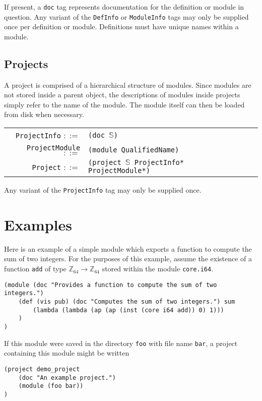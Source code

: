 \documentclass[11pt]{book}
\begin{document}
If present, a \lstinline{doc} tag represents documentation for the definition or module in question.
Any variant of the \lstinline{DefInfo} or \lstinline{ModuleInfo} tags may only be supplied once per definition or module.
Definitions must have unique names within a module.

\subsection{Projects}

A project is comprised of a hierarchical structure of modules.
Since modules are not stored inside a parent object, the descriptions of modules inside projects simply refer to the name of the module.
The module itself can then be loaded from disk when necessary.

\begin{tabular}{r l p{7cm}}
    \lstinline!ProjectInfo! \( ::= \) & \lstinline!(doc !\( \mathbb S \)\lstinline!)! \\
    \lstinline!ProjectModule! \( ::= \) & \lstinline!(module QualifiedName)! \\
    \lstinline!Project! \( ::= \) & \lstinline!(project !\( \mathbb S \)\lstinline! ProjectInfo* ProjectModule*)! \\
\end{tabular}

Any variant of the \lstinline{ProjectInfo} tag may only be supplied once.

\section{Examples}
Here is an example of a simple module which exports a function to compute the sum of two integers.
For the purposes of this example, assume the existence of a function \lstinline{add} of type \( \mathbb Z_{64} \to \mathbb Z_{64} \) stored within the module \lstinline{core.i64}.
\begin{lstlisting}
(module (doc "Provides a function to compute the sum of two integers.")
    (def (vis pub) (doc "Computes the sum of two integers.") sum
        (lambda (lambda (ap (ap (inst (core i64 add)) 0) 1)))
    )
)
\end{lstlisting}
If this module were saved in the directory \lstinline{foo} with file name \lstinline{bar}, a project containing this module might be written
\begin{lstlisting}
(project demo_project
    (doc "An example project.")
    (module (foo bar))
)
\end{lstlisting}
\end{document}
